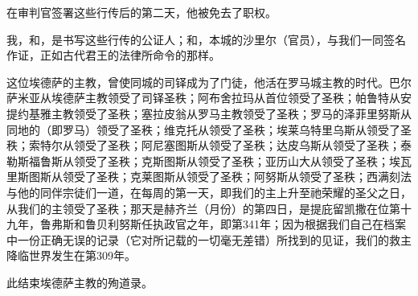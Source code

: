 在审判官签署这些行传后的第二天，他被免去了职权。\par

我，和，是书写这些行传的公证人；和，本城的沙里尔（官员），与我们一同签名作证，正如古代君王的法律所命令的那样。\par

这位埃德萨的主教，曾使同城的司铎成为了门徒，他活在罗马城主教的时代。巴尔萨米亚从埃德萨主教领受了司铎圣秩；阿布舍拉玛从首位领受了圣秩；帕鲁特从安提约基雅主教领受了圣秩；塞拉皮翁从罗马主教领受了圣秩；罗马的泽菲里努斯从同地的（即罗马）领受了圣秩；维克托从领受了圣秩；埃莱乌特里乌斯从领受了圣秩；索特尔从领受了圣秩；阿尼塞图斯从领受了圣秩；达皮乌斯从领受了圣秩；泰勒斯福鲁斯从领受了圣秩；克斯图斯从领受了圣秩；亚历山大从领受了圣秩；埃瓦里斯图斯从领受了圣秩；克莱图斯从领受了圣秩；阿努斯从领受了圣秩；西满刻法与他的同伴宗徒们一道，在每周的第一天，即我们的主上升至祂荣耀的圣父之日，从我们的主领受了圣秩；那天是赫齐兰（月份）的第四日，是提庇留凯撒在位第十九年，鲁弗斯和鲁贝利努斯任执政官之年，即第341年；因为根据我们自己在档案中一份正确无误的记录（它对所记载的一切毫无差错）所找到的见证，我们的救主降临世界发生在第309年。\par

此结束埃德萨主教的殉道录。\par

